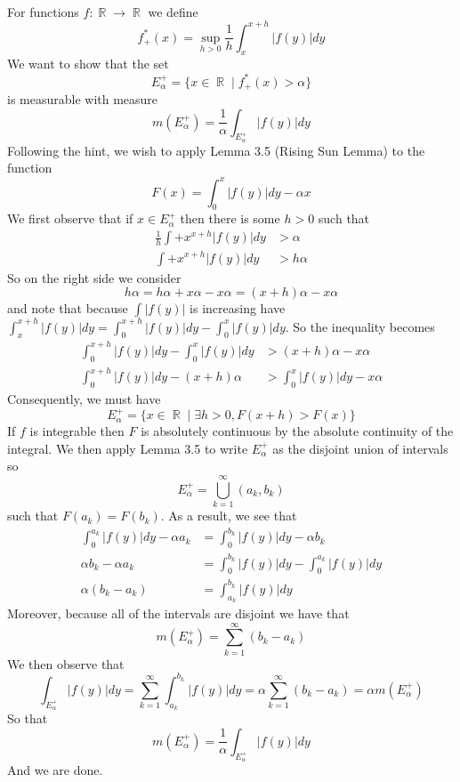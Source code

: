\documentclass{article}
\DeclareMathOperator{\R}{\mathbb{R}}
\DeclareMathOperator{\suchthat}{\mathrel{|}}
\newcommand{\problem}[1]{\noindent{\textbf{Problem #1}}\\}
\begin{document}
\problem{3.5.6}
For functions $f: \R \to \R$ we define
\[
f^*_+(x) = \sup_{h > 0} \frac{1}{h}\int_x^{x+h}|f(y)|dy
\]
We want to show that the set
\[
E_\alpha^+ = \{x \in \R \suchthat f_+^*(x) > \alpha\}
\]
is measurable with measure
\[
m(E_\alpha^+) = \frac{1}{\alpha}\int_{E_\alpha^+}|f(y)|dy
\]
Following the hint, we wish to apply Lemma 3.5 (Rising Sun Lemma) to the function 
\[
F(x) = \int_0^x|f(y)|dy - \alpha x
\]
We first observe that if $x \in E_\alpha^+$ then there is some $h > 0$ such that 
\begin{align*}
\frac{1}{h}\int+x^{x+h} |f(y)|dy &> \alpha \\ 
\int+x^{x+h} |f(y)|dy &> h\alpha
\end{align*}
So on the right side we consider 
\[
h\alpha = h\alpha + x\alpha - x\alpha = (x+h)\alpha  - x\alpha
\]
and note that because $\int|f(y)|$ is increasing have $\int_x^{x+h} |f(y)|dy = \int_0^{x+h} |f(y)|dy - \int_0^x |f(y)|dy$. So the inequality becomes
\begin{align*}
\int_0^{x+h} |f(y)|dy - \int_0^x |f(y)|dy &> (x+h)\alpha - x\alpha \\
\int_0^{x+h} |f(y)|dy -  (x+h)\alpha &> \int_0^x |f(y)|dy - x\alpha 
\end{align*}
Consequently, we must have 
\[
E_\alpha^+ = \{x \in \R \suchthat \exists h > 0, F(x+h) > F(x)\}
\]
If $f$ is integrable then $F$ is absolutely continuous by the absolute continuity of the integral. We then apply Lemma 3.5 to write $E_\alpha^+$ as the disjoint union of intervals so
\[
E_\alpha^+ = \bigcup_{k=1}^\infty (a_k, b_k)
\]
such that $F(a_k) = F(b_k)$. As a result, we see that
\begin{align*}
\int_0^{a_k} |f(y)|dy - \alpha a_k &= \int_{0}^{b_k}|f(y)|dy - \alpha b_k \\
 \alpha b_k - \alpha a_k &= \int_{0}^{b_k}|f(y)|dy - \int_0^{a_k} |f(y)|dy \\
 \alpha(b_k - a_k) &= \int_{a_k}^{b_k} |f(y)|dy
\end{align*}
Moreover, because all of the intervals are disjoint we have that
\[
m(E_\alpha^+) = \sum_{k=1}^\infty (b_k - a_k)
\]
We then observe that
\[
\int_{E_\alpha^+} |f(y)|dy = \sum_{k=1}^\infty \int_{a_k}^{b_k} |f(y)|dy = \alpha\sum_{k=1}^\infty (b_k - a_k) = \alpha m(E_\alpha^+)
\]
So that
\[
m(E_\alpha^+) = \frac{1}{\alpha}\int_{E_\alpha^+}|f(y)|dy 
\]
And we are done.
\pagebreak
\end{document}
